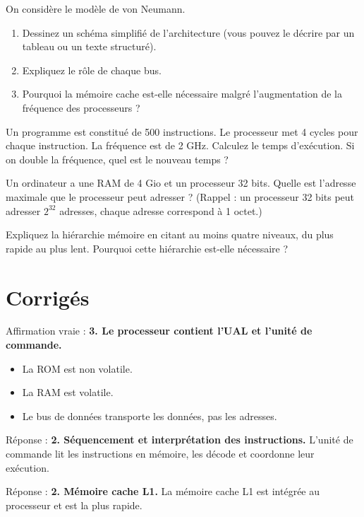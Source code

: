 \exo{}
On considère le modèle de von Neumann.
\begin{enumerate}
    \item Dessinez un schéma simplifié de l’architecture (vous pouvez le décrire par un tableau ou un texte structuré).
    \item Expliquez le rôle de chaque bus.
    \item Pourquoi la mémoire cache est-elle nécessaire malgré l’augmentation de la fréquence des processeurs ?
\end{enumerate}


\exo{}
Un programme est constitué de 500 instructions. Le processeur met 4 cycles pour chaque instruction. La fréquence est de 2 GHz. Calculez le temps d’exécution. Si on double la fréquence, quel est le nouveau temps ?

\exo{}
Un ordinateur a une RAM de 4 Gio et un processeur 32 bits. Quelle est l’adresse maximale que le processeur peut adresser ? (Rappel : un processeur 32 bits peut adresser $2^{32}$ adresses, chaque adresse correspond à 1 octet.)

\exo{}
Expliquez la hiérarchie mémoire en citant au moins quatre niveaux, du plus rapide au plus lent. Pourquoi cette hiérarchie est-elle nécessaire ?

\section{Corrigés}

Affirmation vraie : \textbf{3. Le processeur contient l’UAL et l’unité de commande.}
\begin{itemize}
    \item La ROM est non volatile.
    \item La RAM est volatile.
    \item Le bus de données transporte les données, pas les adresses.
\end{itemize}

Réponse : \textbf{2. Séquencement et interprétation des instructions.}
L’unité de commande lit les instructions en mémoire, les décode et coordonne leur exécution.

Réponse : \textbf{2. Mémoire cache L1.}
La mémoire cache L1 est intégrée au processeur et est la plus rapide.

